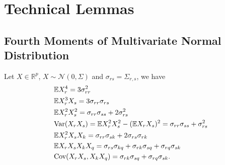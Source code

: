 \section{Technical Lemmas}
\label{sec:technical_lemmas}
\subsection{\bf Fourth Moments of Multivariate Normal Distribution}
\label{subsec: gaussian_fourth_moments}
Let $X\in \mathbb{R}^p$, $X\sim \mathcal{N}(0, \Sigma)$ and $\sigma_{rs} = \Sigma_{r,s}$, we have 
\begin{equation}
\label{eq:gauss_fourth_moment}
\begin{aligned}
&\mathbb{E} X^4_r = 3\sigma_{rr}^2\\
&\mathbb{E}X^3_rX_s = 3\sigma_{rr}\sigma_{rs}\\
&\mathbb{E}X^2_rX^2_s = \sigma_{rr}\sigma_{ss}+2\sigma^2_{rs}\\
&\mbox{Var}(X_rX_s) = \mathbb{E}X^2_rX^2_s-(\mathbb{E}X_rX_s)^2 =\sigma_{rr}\sigma_{ss}+\sigma^2_{rs}\\
&\mathbb{E}X_r^2X_sX_k = \sigma_{rr}\sigma_
{sk}+2\sigma_{rs}\sigma_{rk}\\
&\mathbb{E}X_rX_sX_kX_q = \sigma_{rs}\sigma_{kq}+\sigma_{rk}\sigma_{sq}+\sigma_{rq}\sigma_{sk}\\
&\mbox{Cov}(X_rX_s, X_kX_q) = \sigma_{rk}\sigma_{sq}+\sigma_{rq}\sigma_{sk}.
\end{aligned}
\end{equation}




